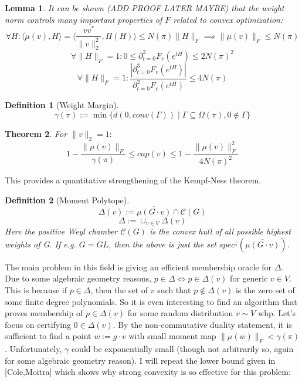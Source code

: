 \documentclass{article}
\newtheorem{theorem}{Theorem}
\newtheorem{lemma}[theorem]{Lemma}
\newtheorem{definition}{Definition}
\begin{document}
\begin{lemma}
It can be shown (ADD PROOF LATER MAYBE) that the weight norm controls many important properties of $F$ related to convex optimization:
\[ \forall H: \langle \mu(v), H \rangle = \langle \frac{v v^{*}}{\|v\|_{2}^{2}}, \Pi(H) \rangle \leq N(\pi) \|H\|_{F} \implies \|\mu(v)\|_{F} \leq N(\pi)  \]
\[ \forall \|H\|_{F} = 1: 0 \leq \partial_{t=0}^{2} F_{v}(e^{tH}) \leq 2 N(\pi)^{2}  \]
\[ \forall \|H\|_{F} = 1: \frac{|\partial_{t=0}^{3} F_{v}(e^{tH})|}{\partial_{t=0}^{2} F_{v}(e^{tH})} \leq 4 N(\pi)  \]
\end{lemma}

\begin{definition} [Weight Margin]
\[ \gamma(\pi) := \min \{ d(0, conv(\Gamma)) \mid \Gamma \subseteq \Omega(\pi), 0 \not\in \Gamma \}   \]
\end{definition}

\begin{theorem}
For $\|v\|_{2} = 1:$
\[ 1 - \frac{\|\mu(v)\|_{F}}{\gamma(\pi)} \leq cap(v) \leq 1 - \frac{\|\mu(v)\|_{F}^{2}}{4 N(\pi)^{2}}   \]
\end{theorem}
This provides a quantitative strengthening of the Kempf-Ness theorem. 

\begin{definition} [Moment Polytope]
\[ \Delta(v) := \overline{\mu(G \cdot v)} \cap \mathcal{C}(G)  \]
\[ \Delta := \cup_{v \in V} \Delta(v)   \]
Here the positive Weyl chamber $\mathcal{C}(G)$ is the convex hull of all possible highest weights of G. If e.g. $G = GL$, then the above is just the set $spec^{\downarrow}(\overline{\mu(G \cdot v)})$. 
\end{definition}

The main problem in this field is giving an efficient membership oracle for $\Delta$. Due to some algebraic geometry reasons, $p \in \Delta \iff p \in \Delta(v)$ for generic $v \in V$. This is because if $p \in \Delta$, then the set of $v$ such that $p \not\in \Delta(v)$ is the zero set of some finite degree polynomials. So it is even interesting to find an algorithm that proves membership of $p \in \Delta(v)$ for some random distribution $v \sim V$ whp. Let's focus on certifying $0 \in \Delta(v)$. By the non-commutative duality statement, it is sufficient to find a point $w := g \cdot v$ with small moment map $\|\mu(w)\|_{F} < \gamma(\pi)$. Unfortunately, $\gamma$ could be exponentially small (though not arbitrarily so, again for some algebraic geometry reason). I will repeat the lower bound given in [Cole,Moitra] which shows why strong convexity is so effective for this problem:
\end{document}
